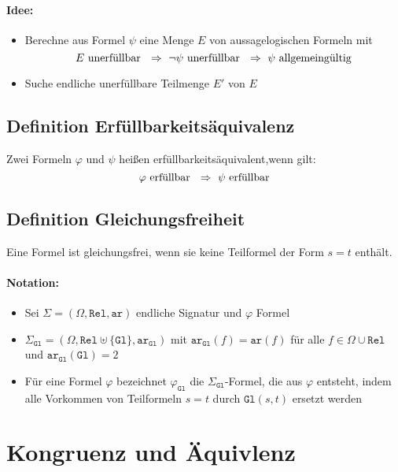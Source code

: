 \documentclass[12pt,a4paper]{report}
\newcommand{\RA}{\Rightarrow}
\newcommand{\red}[1]{\textcolor[rgb]{0.9,0.2,0.2}{#1}}
\newcommand{\blue}[1]{\textcolor[rgb]{0.2,0.2,1}{#1}}
\begin{document}
\paragraph{Idee:}
\begin{itemize}
    \item Berechne aus Formel $ \psi $ eine Menge $ E $ von aussagelogischen Formeln mit
    \[
        E \textnormal{ unerfüllbar }  ~\RA~ \lnot \psi \textnormal{ unerfüllbar } ~\RA~ \psi \textnormal{ allgemeingültig}
    \]
    \item Suche endliche unerfüllbare Teilmenge $ E' $ von $ E $
\end{itemize}
\subsection{\blue{Definition Erfüllbarkeitsäquivalenz}}
Zwei Formeln $ \varphi $ und $ \psi $ heißen \red{erfüllbarkeitsäquivalent},wenn gilt:
\[
    \varphi \textnormal{ erfüllbar } ~\RA~ \psi \textnormal{ erfüllbar}
\]
\subsection{\blue{Definition Gleichungsfreiheit}}
Eine Formel ist \red{gleichungsfrei}, wenn sie keine Teilformel der Form $ s = t $ enthält.
\paragraph{Notation:}
\begin{itemize}
    \item Sei $ \Sigma = (\Omega, \texttt{Rel}, \texttt{ar}) $ endliche Signatur und $ \varphi $ Formel
    \item \red{$ \Sigma_{\texttt{Gl}} $}$ = (\Omega, \texttt{Rel} \uplus \{\texttt{Gl}\}, \texttt{ar}_{\texttt{Gl}}) $ mit $ \texttt{ar}_{\texttt{Gl}}(f) = \texttt{ar}(f)  $ für alle $ f \in \Omega \cup \texttt{Rel} $ und $ \texttt{ar}_{\texttt{Gl}}(\texttt{Gl}) = 2 $
    \item Für eine Formel $ \varphi $ bezeichnet $ \varphi_{\texttt{Gl}} $ die $ \Sigma_{\texttt{Gl}} $-Formel, die aus $ \varphi $ entsteht, indem alle Vorkommen von Teilformeln $ s = t $ durch $ \texttt{Gl}(s,t) $ ersetzt werden
\end{itemize}
\section{\blue{Kongruenz und Äquivlenz}}
\end{document}
